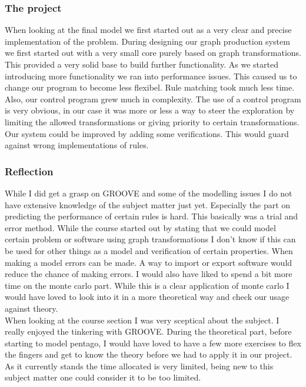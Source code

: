 \subsubsection{The project}

When looking at the final model we first started out as a very clear and precise implementation of the problem. During designing our graph production system we first started out with a very small core purely based on graph transformations. This provided a very solid base to build further functionality. As we started introducing more functionality we ran into performance issues. This caused us to change our program to become less flexibel. Rule matching took much less time. Also, our control program grew much in complexity. The use of a control program is very obvious, in our case it was more or less a way to steer the exploration by limiting the allowed transformations or giving priority to certain transformations. Our system could be improved by adding some verifications. This would guard against wrong implementations of rules. 

\subsubsection{Reflection}
While I did get a grasp on GROOVE and some of the modelling issues I do not have extensive knowledge of the subject matter just yet. Especially the part on predicting the performance of certain rules is hard. This basically was a trial and error method. While the course started out by stating that we could model certain problem or software using graph transformations I don't know if this can be used for other things as a model and verification of certain properties. When making a model errors can be made. A way to import or export software would reduce the chance of making errors. I would also have liked to spend a bit more time on the monte carlo part. While this is a clear application of monte carlo I would have loved to look into it in a more theoretical way and check our usage against theory.\\
When looking at the course section I was very sceptical about the subject. I really enjoyed the tinkering with GROOVE. During the theoretical part, before starting to model pentago, I would have loved to have a few more exercises to flex the fingers and get to know the theory before we had to apply it in our project. As it currently stands the time allocated is very limited, being new to this subject matter one could consider it to be too limited.